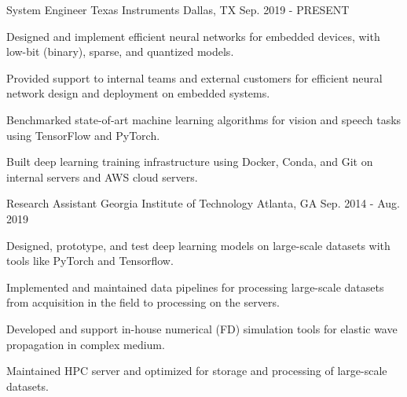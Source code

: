 

\begin{cventries}

\cventry
{System Engineer} %
{Texas Instruments} %
{Dallas, TX} %
{Sep. 2019 - PRESENT} %
{
		\begin{cvitems} %
			\item {Designed and implement efficient neural networks for embedded devices, with low-bit (binary), sparse, and quantized models.}
			\item {Provided support to internal teams and external customers for efficient neural network design and deployment on embedded systems.}
			\item {Benchmarked state-of-art machine learning algorithms for vision and speech tasks using TensorFlow and PyTorch.}
			\item {Built deep learning training infrastructure using Docker, Conda, and Git on internal servers and AWS cloud servers.}
		\end{cvitems}
}

	\cventry
		{Research Assistant} %
		{Georgia Institute of Technology} %
		{Atlanta, GA} %
		{Sep. 2014 - Aug. 2019} %
		{
			\begin{cvitems} %
				\item {Designed, prototype, and test deep learning models on large-scale datasets with tools like PyTorch and Tensorflow.}
				\item {Implemented and maintained data pipelines for processing large-scale datasets from acquisition in the field to processing on the servers.}
				\item {Developed and support in-house numerical (FD) simulation tools for elastic wave propagation in complex medium.}
				\item {Maintained HPC server and optimized for storage and processing of large-scale datasets.}
			\end{cvitems}
		}


\end{cventries}
